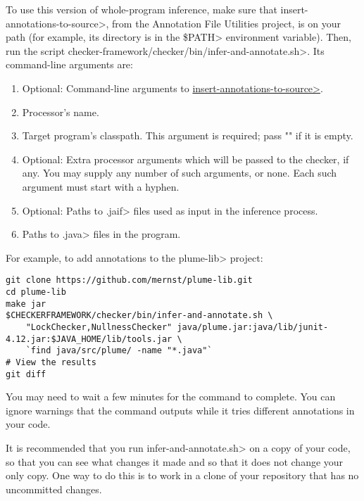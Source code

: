 \begin{sloppypar}
To use this version of whole-program inference, make sure that
\<insert-annotations-to-source>, from the Annotation File Utilities project,
is on your path (for example, its directory is in the \<\$PATH> environment variable).
Then, run the script \<checker-framework/checker/bin/infer-and-annotate.sh>.
Its command-line arguments are:
\end{sloppypar}

\begin{enumerate}
\item Optional: Command-line arguments to
  \href{https://checkerframework.org/annotation-file-utilities/#insert-annotations-to-source}{\<insert-annotations-to-source>}.
\item Processor's name.
\item Target program's classpath.  This argument is required; pass "" if it
  is empty.
\item Optional: Extra processor arguments which will be passed to the checker, if any.
  You may supply any number of such arguments, or none.  Each such argument
  must start with a hyphen.
\item Optional: Paths to \<.jaif> files used as input in the inference
    process.
\item Paths to \<.java> files in the program.
\end{enumerate}

For example, to add annotations to the \<plume-lib> project:
\begin{Verbatim}
git clone https://github.com/mernst/plume-lib.git
cd plume-lib
make jar
$CHECKERFRAMEWORK/checker/bin/infer-and-annotate.sh \
    "LockChecker,NullnessChecker" java/plume.jar:java/lib/junit-4.12.jar:$JAVA_HOME/lib/tools.jar \
    `find java/src/plume/ -name "*.java"`
# View the results
git diff
\end{Verbatim}

You may need to wait a few minutes for the command to complete.
You can ignore warnings that the command outputs while it tries different
annotations in your code.

It is recommended that you run \<infer-and-annotate.sh> on a copy of your
code, so that you can see what changes it made and so that it does not
change your only copy.  One way to do this is to work in a clone of your
repository that has no uncommitted changes.


